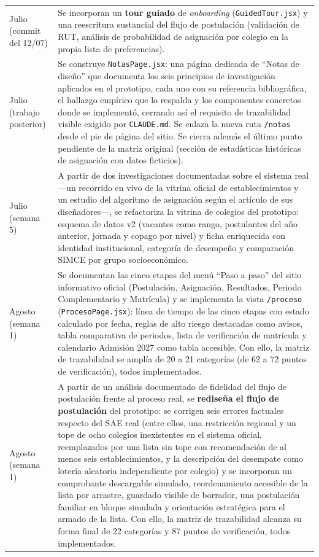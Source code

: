 {\begin{longtable}{p{2.2cm}p{9.5cm}}
Julio (commit del 12/07) & Se incorporan un \textbf{tour guiado} de \emph{onboarding} (\texttt{GuidedTour.jsx}) y una reescritura sustancial del flujo de postulación (validación de RUT, análisis de probabilidad de asignación por colegio en la propia lista de preferencias). \\
Julio (trabajo posterior) & Se construye \texttt{NotasPage.jsx}: una página dedicada de ``Notas de diseño'' que documenta los seis principios de investigación aplicados en el prototipo, cada uno con su referencia bibliográfica, el hallazgo empírico que lo respalda y los componentes concretos donde se implementó, cerrando así el requisito de trazabilidad visible exigido por \texttt{CLAUDE.md}. Se enlaza la nueva ruta \texttt{/notas} desde el pie de página del sitio. Se cierra además el último punto pendiente de la matriz original (sección de estadísticas históricas de asignación con datos ficticios). \\
Julio (semana 5) & A partir de dos investigaciones documentadas sobre el sistema real —un recorrido en vivo de la vitrina oficial de establecimientos y un estudio del algoritmo de asignación según el artículo de sus diseñadores—, se refactoriza la vitrina de colegios del prototipo: esquema de datos v2 (vacantes como rango, postulantes del año anterior, jornada y copago por nivel) y ficha enriquecida con identidad institucional, categoría de desempeño y comparación SIMCE por grupo socioeconómico. \\
Agosto (semana 1) & Se documentan las cinco etapas del menú ``Paso a paso'' del sitio informativo oficial (Postulación, Asignación, Resultados, Periodo Complementario y Matrícula) y se implementa la vista \texttt{/proceso} (\texttt{ProcesoPage.jsx}): línea de tiempo de las cinco etapas con estado calculado por fecha, reglas de alto riesgo destacadas como avisos, tabla comparativa de periodos, lista de verificación de matrícula y calendario Admisión 2027 como tabla accesible. Con ello, la matriz de trazabilidad se amplía de 20 a 21 categorías (de 62 a 72 puntos de verificación), todos implementados. \\
Agosto (semana 1) & A partir de un análisis documentado de fidelidad del flujo de postulación frente al proceso real, se \textbf{rediseña el flujo de postulación} del prototipo: se corrigen seis errores factuales respecto del SAE real (entre ellos, una restricción regional y un tope de ocho colegios inexistentes en el sistema oficial, reemplazados por una lista sin tope con recomendación de al menos seis establecimientos, y la descripción del desempate como lotería aleatoria independiente por colegio) y se incorporan un comprobante descargable simulado, reordenamiento accesible de la lista por arrastre, guardado visible de borrador, una postulación familiar en bloque simulada y orientación estratégica para el armado de la lista. Con ello, la matriz de trazabilidad alcanza su forma final de 22 categorías y 87 puntos de verificación, todos implementados. \\

\end{longtable}}
